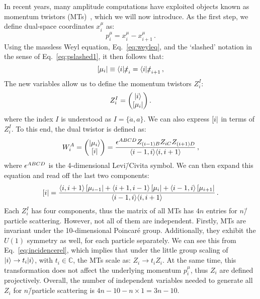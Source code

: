 \documentclass[main.tex]{subfiles}
\begin{document}
In recent years, many amplitude computations have exploited objects known as momentum twistors (MTs)~\cite{Hodges:2009hk, Badger:2013gxa, Badger:2016uuq}, which we will now introduce. As the first step, we define dual-space coordinates $x_i^\mu$ as:
\begin{equation} \label{eq:dualspacedef}
    p_i^\mu = x_i^\mu - x_{i+1}^\mu\,.
\end{equation}
Using the massless Weyl equation, Eq.~\ref{eq:weyleq}, and the `slashed' notation in the sense of Eq.~\ref{eq:pslashed1}, it then follows that:
\begin{equation} \label{eq:incidencerel}
    \left[ \mu_i \right| \equiv \langle i|\slashed{x}_i = \langle i|\slashed{x}_{i+1}\,,
\end{equation}
The new variables allow us to define the momentum twistors $Z_i^I$:
\begin{equation} \label{eq:momtwistor}
    Z_i^I = 
    \begin{pmatrix}
        |i \rangle \\
        \left[ \mu_i \right| 
    \end{pmatrix}.
\end{equation}
where the index $I$ is understood as $I=\{\dot{a},a\}$. We can also express $\left[ i \right|$ in terms of $Z_i^I$. To this end, the dual twistor is defined as:
\begin{equation} \label{eq:dualmomtwistor}
    W_i^A = 
    \begin{pmatrix}
        |\mu_i \rangle \\
        \left[ i \right|
    \end{pmatrix} = 
    \frac{\epsilon^{ABCD} Z_{(i-1)B} Z_{iC} Z_{(i+1)D}}{\langle i-1, i \rangle \langle i, i+1 \rangle}\,,
\end{equation}
where $\epsilon^{ABCD}$ is the 4-dimensional Levi\=/Civita symbol. We can then expand this equation and read off the last two components:
\begin{equation}
    \left[ i \right| = \frac{\langle i, i+1 \rangle\left[ \mu_{i-1} \right| + \langle i+1, i-1 \rangle\left[ \mu_i \right| + \langle i-1, i \rangle\left[ \mu_{i+1} \right| }{\langle i-1, i \rangle\langle i, i+1 \rangle}\,.
\end{equation}
Each $Z_i^I$ has four components, thus the matrix of all MTs has $4n$ entries for $n$\=/particle scattering. However, not all of them are independent. Firstly, MTs are invariant under the 10-dimensional Poincaré group. Additionally, they exhibit the $U(1)$ symmetry as well, for each particle separately. We can see this from Eq.~\ref{eq:incidencerel}, which implies that under the little group scaling of $|i \rangle\rightarrow t_i|i \rangle$, with $t_i \in \mathbb{C}$, the MTs scale as: $Z_i \rightarrow t_i Z_i$. At the same time, this transformation does not affect the underlying momentum $p_i^\mu$, thus $Z_i$ are defined projectively. Overall, the number of independent variables needed to generate all $Z_i$ for $n$\=/particle scattering is $4n-10-n\times1 = 3n-10$.
\end{document}
